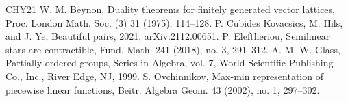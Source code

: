 \documentclass[10pt]{amsart}
\theoremstyle{definition}
\theoremstyle{remark}
\theoremstyle{plain}
\theoremstyle{definition}
\begin{document}
\begin{thebibliography}{CHY21}
 W. M. Beynon, Duality theorems for finitely generated vector lattices, Proc. London Math. Soc. (3) 31 (1975), 114--128.
 P. Cubides Kovacsics, M. Hils, and J. Ye, Beautiful pairs, 2021, arXiv:2112.00651.
 P. Eleftheriou, Semilinear stars are contractible, Fund. Math. 241 (2018), no. 3, 291--312.
 A. M. W. Glass, Partially ordered groups, Series in Algebra, vol. 7, World Scientific Publishing Co., Inc., River Edge, NJ, 1999.
 S. Ovchinnikov, Max-min representation of piecewise linear functions, Beitr. Algebra Geom. 43 (2002), no. 1, 297--302.
\end{thebibliography}
\end{document}

